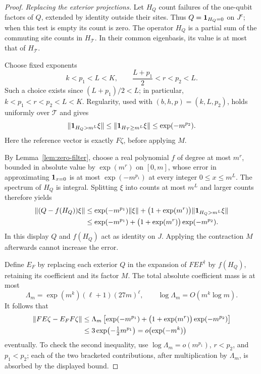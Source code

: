 \begin{proof}
\emph{Replacing the exterior projections.}
Let $H_Q$ count failures of the one-qubit factors of $Q$,
extended by identity outside their sites.  Thus
$Q=\mathbf 1_{H_Q=0}$ on $J^c$; when this test is empty its count is
zero.  The operator $H_Q$ is a partial sum of the commuting site
counts in $H_{\mathcal T}$.  In their common eigenbasis, its value is at
most that of $H_{\mathcal T}$.

Choose fixed exponents
\[
 k<p_1<L<K,
 \qquad
 \frac{L+p_1}{2}<r<p_2<L.
\]
Such a choice exists since $(L+p_1)/2<L$; in particular,
$k<p_1<r<p_2<L<K$.  Regularity, used with
$(b,h,p)=(k,L,p_2)$, holds uniformly over $\mathcal T$ and gives
\[
 \lVert\mathbf 1_{H_Q>m^L}\xi\rVert
 \le \lVert\mathbf 1_{H_{\mathcal T}\ge m^L}\xi\rVert
 \le \exp(-m^{p_2}).
\]
Here the reference vector is exactly $F\zeta$, before applying
$M$.

By Lemma~\ref{lem:zero-filter}, choose a real polynomial $f$ of degree
at most $m^r$, bounded in absolute value by $\exp(m^r)$ on $[0,m]$,
whose error in approximating $\mathbf 1_{x=0}$ is at most
$\exp(-m^{p_1})$ at every integer $0\le x\le m^L$.
The spectrum of $H_Q$ is integral.  Splitting $\xi$ into counts at
most $m^L$ and larger counts therefore yields
\begin{align*}
 \lVert(Q-f(H_Q))\xi\rVert
 &\le \exp(-m^{p_1})\lVert\xi\rVert
    +\bigl(1+\exp(m^r)\bigr)
       \lVert\mathbf 1_{H_Q>m^L}\xi\rVert\\
 &\le \exp(-m^{p_1})
    +\bigl(1+\exp(m^r)\bigr)\exp(-m^{p_2}).
\end{align*}
In this display $Q$ and $f(H_Q)$ act as identity on $J$.
Applying the contraction $M$ afterwards cannot increase the
error.

Define $E_F$ by replacing each exterior $Q$ in the expansion
of $FEF^\dagger$ by $f(H_Q)$, retaining its coefficient and its
factor $M$.  The total absolute coefficient mass is at most
\[
 \Lambda_m
 =\exp(m^k)(\ell+1)(27m)^\ell,
 \qquad \log\Lambda_m=O(m^k\log m).
\]
It follows that
\begin{align*}
 \lVert FE\zeta-E_FF\zeta\rVert
 &\le \Lambda_m\left[
       \exp(-m^{p_1})
       +\bigl(1+\exp(m^r)\bigr)\exp(-m^{p_2})
       \right]\\
 &\le 3\exp\bigl(-\tfrac12m^{p_1}\bigr)
   =o\bigl(\exp(-m^k)\bigr)
\end{align*}
eventually.  To check the second inequality, use
$\log\Lambda_m=o(m^{p_1})$, $r<p_2$, and $p_1<p_2$;
each of the two bracketed contributions, after multiplication by
$\Lambda_m$, is absorbed by the displayed bound.


\end{proof}
